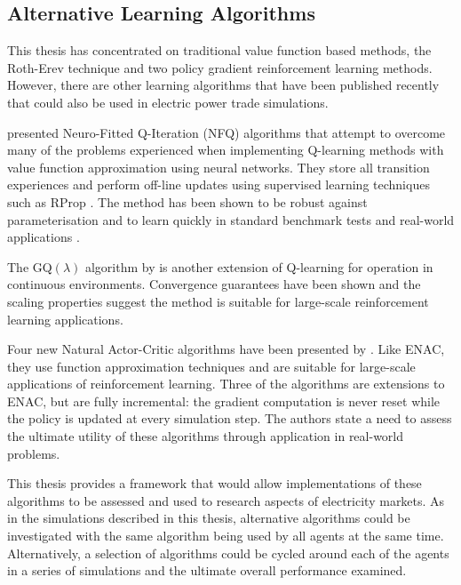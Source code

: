 
\subsection{Alternative Learning Algorithms}
This thesis has concentrated on traditional value function based methods, the
Roth-Erev technique and two policy gradient reinforcement learning methods.
However, there are other learning algorithms that have been published recently
that could also be used in electric power trade simulations.

 presented Neuro-Fitted Q-Iteration (NFQ)
algorithms that attempt to overcome many of the problems experienced when implementing
Q-learning methods with value function approximation using neural networks.
They store all transition experiences and perform off-line updates using
supervised learning techniques such as RProp \cite{riedmiller93}.  The method
has been shown to be robust against parameterisation and to learn quickly in
standard benchmark tests and real-world applications \cite{kietzmann09}.

The GQ$(\lambda)$ algorithm by  is another extension of Q-learning
for operation in continuous environments.  Convergence guarantees have been
shown and the scaling properties suggest the method is suitable for large-scale
reinforcement learning applications.

Four new Natural Actor-Critic algorithms have been presented by
. Like ENAC, they use function approximation techniques and
are suitable for large-scale applications of reinforcement learning.  Three of
the algorithms are extensions to ENAC, but are fully incremental: the gradient
computation is never reset while the policy is updated at every simulation step.
 The authors state a need to assess the ultimate utility of these algorithms
through application in real-world problems.

This thesis provides a framework that would allow implementations of these
algorithms to be assessed and used to research aspects of electricity
markets.  As in the simulations described in this thesis, alternative algorithms
could be investigated with the same algorithm being used by all agents at the
same time.  Alternatively, a selection of algorithms could be cycled
around each of the agents in a series of simulations and the ultimate overall
performance examined.

